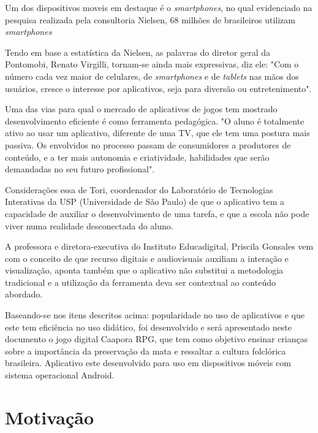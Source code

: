 Um dos dispositivos moveis em destaque é o \textit{smartphones}, no qual evidenciado na pesquisa realizada pela consultoria Nielsen, 68 milhões de brasileiros utilizam \textit{smartphones} \cite{nie} 

Tendo em base a estatística da Nielsen, as palavras do diretor geral da Pontomobi, Renato Virgilli, tornam-se ainda mais expressivas, diz ele: "Com o número cada vez maior de celulares, de \textit{smartphones} e de \textit{tablets} nas mãos dos usuários, cresce o interesse por aplicativos, seja para diversão ou entretenimento". \cite{vir}

Uma das vias para qual o mercado de aplicativos de jogos tem mostrado desenvolvimento eficiente é como ferramenta pedagógica.
"O aluno é totalmente ativo ao usar um aplicativo, diferente de uma TV, que ele tem uma postura mais passiva. Os envolvidos no processo passam de consumidores a produtores de conteúdo, e a ter mais autonomia e criatividade, habilidades que serão demandadas no seu futuro profissional".

Considerações essa de Tori, coordenador do Laboratório de Tecnologias Interativas da USP (Universidade de São Paulo) de que o aplicativo tem a capacidade de auxiliar o desenvolvimento de uma tarefa, e que a escola não pode viver numa realidade desconectada do aluno.

A professora e diretora-executiva do Instituto Educadigital, Priscila Gonsales vem com o conceito de que recurso digitais e audiovisuais auxiliam a interação e visualização, aponta também que o aplicativo não substitui a metodologia tradicional e a utilização da ferramenta deva ser contextual ao conteúdo abordado. \cite{tori}

Baseando-se nos itens descritos acima: popularidade no uso de aplicativos e que este tem eficiência no uso didático, foi desenvolvido e será apresentado neste documento o jogo digital Caapora RPG, que tem como objetivo ensinar crianças sobre a importância da preservação da mata e ressaltar a cultura folclórica brasileira.
Aplicativo este desenvolvido para uso em  dispositivos móveis com sistema operacional Android.

\section{Motivação}
\label{cap:motivacao}


